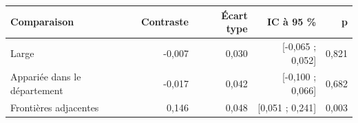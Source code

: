 \begin{tabularx}{\linewidth}{Xrrrr}
\toprule
Comparaison & Contraste & Écart type & IC à 95 \% & p \\
\midrule
Large & -0,007 & 0,030 & [-0,065 ; 0,052] & 0,821 \\
Appariée dans le département & -0,017 & 0,042 & [-0,100 ; 0,066] & 0,682 \\
Frontières adjacentes & 0,146 & 0,048 & [0,051 ; 0,241] & 0,003 \\
\bottomrule
\end{tabularx}
